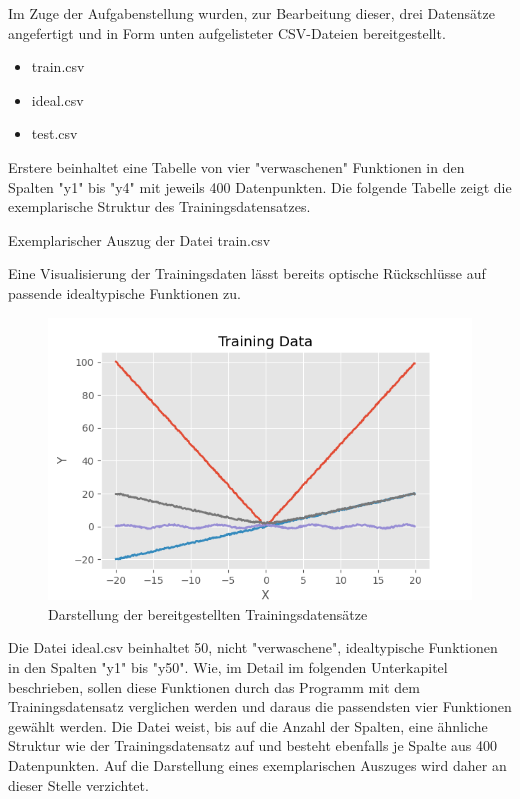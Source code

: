 Im Zuge der Aufgabenstellung wurden, zur Bearbeitung dieser, drei Datensätze angefertigt und in Form unten aufgelisteter CSV-Dateien bereitgestellt.

\begin{itemize}
 \itemsep0pt
 \item train.csv
 \item ideal.csv
 \item test.csv
\end{itemize}

Erstere beinhaltet eine Tabelle von vier "verwaschenen" Funktionen in den Spalten "y1" bis "y4" mit jeweils 400 Datenpunkten. Die folgende Tabelle zeigt die exemplarische Struktur des Trainingsdatensatzes.

\begin{table}[H]
\small
\centering
{}
\caption{Exemplarischer Auszug der Datei train.csv}
\label{tab:Exemplarischer Auszug aus train.csv}
\end{table} 


Eine Visualisierung der Trainingsdaten lässt bereits optische Rückschlüsse auf passende idealtypische Funktionen zu.
\begin{figure}[h]
\centering
\includegraphics[width=12cm]{../output/figures/train.png}
\caption{Darstellung der bereitgestellten Trainingsdatensätze \cite{Gage:18}}\label{fig:train}
\end{figure}

Die Datei ideal.csv beinhaltet 50, nicht "verwaschene", idealtypische Funktionen in den Spalten "y1" bis "y50". Wie, im Detail im folgenden Unterkapitel beschrieben, sollen diese Funktionen durch das Programm mit dem Trainingsdatensatz verglichen werden und daraus die passendsten vier Funktionen gewählt werden. Die Datei weist, bis auf die Anzahl der Spalten, eine ähnliche Struktur wie der Trainingsdatensatz auf und besteht ebenfalls je Spalte aus 400 Datenpunkten. Auf die Darstellung eines exemplarischen Auszuges wird daher an dieser Stelle verzichtet.

